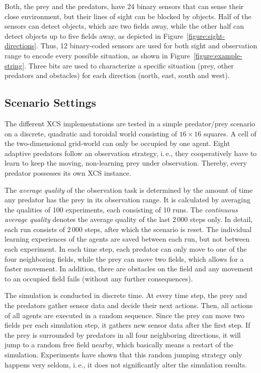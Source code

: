 Both, the prey and the predators, have 24 binary sensors that can sense their close environment, but their lines of sight can be blocked by objects. Half of the sensors can detect objects, which are two fields away, while the other half can detect objects up to five fields away, as depicted in Figure~\ref{figure:sight-directions}. %
Thus, 12 binary-coded sensors are used for both sight and observation range to encode every possible situation, as shown in Figure~\ref{figure:example-string}. Three bits are used to characterize a specific situation (prey, other predators and obstacles) for each direction (north, east, south and west). 

\subsection{Scenario Settings}
\label{subsection:scenario-settings}

The different XCS implementations are tested in a simple predator/prey scenario on a discrete, quadratic and toroidal world consisting of $16 \times 16$ squares. A cell of the two-dimensional grid-world can only be occupied by one agent. 
Eight adaptive predators follow an observation strategy, i.\,e., they cooperatively have to learn to keep the moving, non-learning prey under observation. Thereby, every predator possesses its own XCS instance. 

The \emph{average} \emph{quality} of the observation task is determined by the amount of time any predator has the prey in its observation range. It is calculated by averaging the qualities of 100 experiments, each consisting of 10 runs. The \emph{continuous average quality} denotes the average quality of the last 2\,000 steps only. In detail, each run consists of 2\,000 steps, after which the scenario is reset. The individual learning experiences of the agents are saved between each run, but not between each experiment. In each time step, each predator can only move to one of the four neighboring fields, while the prey can move two fields, which allows for a faster movement. In addition, there are obstacles on the field and any movement to an occupied field fails (without any further consequences). 

The simulation is conducted in discrete time. At every time step, the prey and the predators gather sensor data and decide their next actions. Then, all actions of all agents are executed in a random sequence. Since the prey can move two fields per each simulation step, it gathers new sensor data after the first step. If the prey is surrounded by predators in all four neighboring directions, it will jump to a random free field nearby, which basically means a restart of the simulation. Experiments have shown that this random jumping strategy only happens very seldom, i.\,e., it does not significantly alter the simulation results.


